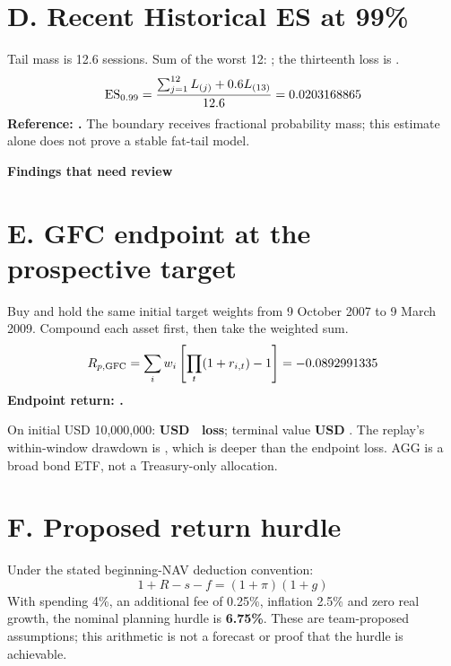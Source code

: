 \documentclass[11pt,a4paper]{article}
\begin{document}
\section*{D. Recent Historical ES at 99\%}
Tail mass is 12.6 sessions. Sum of the worst 12: \nrWorstTwelveSum; the thirteenth loss is \nrThirteenthLoss.
\[
\operatorname{ES}_{0.99}=\frac{\sum_{j=1}^{12}L_{(j)}+0.6L_{(13)}}{12.6}=0.0203168865
\]
\textbf{Reference: \nrHistoricalEsPct.} The boundary receives fractional probability mass; this estimate alone does not prove a stable fat-tail model.

\newpage
{}\par
{\sffamily\bfseries\LARGE\color{qeink} Findings that need review\par}

\section*{E. GFC endpoint at the prospective target}
Buy and hold the same initial target weights from 9 October 2007 to 9 March 2009. Compound each asset first, then take the weighted sum.
\[
R_{p,\mathrm{GFC}}=\sum_i w_i\left[\prod_t(1+r_{i,t})-1\right]=-0.0892991335
\]
\textbf{Endpoint return: \nrGfcPct.}\par
On initial USD 10,000,000: \textbf{USD \nrGfcLossUsd\ loss}; terminal value \textbf{USD \nrGfcEndUsd}. The replay's within-window drawdown is \qeGfcDrawdown, which is deeper than the endpoint loss. AGG is a broad bond ETF, not a Treasury-only allocation.

\section*{F. Proposed return hurdle}
Under the stated beginning-NAV deduction convention:
\[
1+R-s-f=(1+\pi)(1+g)
\]
With spending 4\%, an additional fee of 0.25\%, inflation 2.5\% and zero real growth, the nominal planning hurdle is \textbf{6.75\%}. These are team-proposed assumptions; this arithmetic is not a forecast or proof that the hurdle is achievable.
\end{document}
